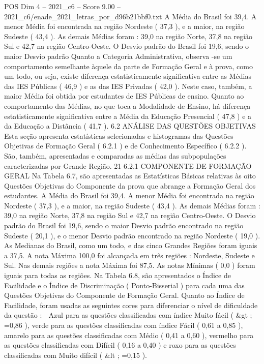 \begin{textsample}{POS Dim 4 – 2021\_c6 – Score 9.00 – 2021\_c6/enade\_2021\_letras\_por\_d96b21bbf0.txt}
A Média do Brasil foi 39,4.
A menor Média foi encontrada na região Nordeste ( 37,3 ), e a maior, na região Sudeste ( 43,4 ).
As demais Médias foram : 39,0 na região Norte, 37,8 na região Sul e 42,7 na região Centro-Oeste.
O Desvio padrão do Brasil foi 19,6, sendo o maior Desvio padrão Quanto a Categoria Administrativa, observa -se um comportamento semelhante àquele da parte de Formação Geral e à prova, como um todo, ou seja, existe diferença estatisticamente significativa entre as Médias das IES Públicas ( 46,9 ) e as das IES Privadas ( 42,0 ).
Neste caso, também, a maior Média foi obtida por estudantes de IES Públicas de ensino.
Quanto ao comportamento das Médias, no que toca a Modalidade de Ensino, há diferença estatisticamente significativa entre a Média da Educação Presencial ( 47,8 ) e a da Educação a Distância ( 41,7 ). 6.2 ANÁLISE DAS QUESTÕES OBJETIVAS Esta seção apresenta estatísticas selecionadas e histogramas das Questões Objetivas de Formação Geral ( 6.2.1 ) e de Conhecimento Específico ( 6.2.2 ).
São, também, apresentadas e comparadas as médias das subpopulações caracterizadas por Grande Região. 21 6.2.1 COMPONENTE DE FORMAÇÃO GERAL Na Tabela 6.7, são apresentadas as Estatísticas Básicas relativas às oito Questões Objetivas do Componente da prova que abrange a Formação Geral dos estudantes.
A Média do Brasil foi 39,4.
A menor Média foi encontrada na região Nordeste ( 37,3 ), e a maior, na região Sudeste ( 43,4 ).
As demais Médias foram : 39,0 na região Norte, 37,8 na região Sul e 42,7 na região Centro-Oeste.
O Desvio padrão do Brasil foi 19,6, sendo o maior Desvio padrão encontrado na região Sudeste ( 20,1 ), e o menor Desvio padrão encontrado na região Nordeste ( 19,0 ).
As Medianas do Brasil, como um todo, e das cinco Grandes Regiões foram iguais a 37,5.
A nota Máxima 100,0 foi alcançada em três regiões : Nordeste, Sudeste e Sul.
Nas demais regiões a nota Máxima foi 87,5.
As notas Mínimas ( 0,0 ) foram iguais para todas as regiões.
Na Tabela 6.8, são apresentados o Índice de Facilidade e o Índice de Discriminação ( Ponto-Bisserial ) para cada uma das Questões Objetivas do Componente de Formação Geral.
Quanto ao Índice de Facilidade, foram usadas as seguintes cores para diferenciar o nível de dificuldade da questão :  Azul para as questões classificadas com índice Muito fácil ( \&gt ; =0,86 ), verde para as questões classificadas com índice Fácil ( 0,61 a 0,85 ), amarelo para as questões classificadas com Médio ( 0,41 a 0,60 ), vermelho para as questões classificadas com Difícil ( 0,16 a 0,40 ) e roxo para as questões classificadas com Muito difícil ( \&lt ; =0,15 ).

\end{textsample}
